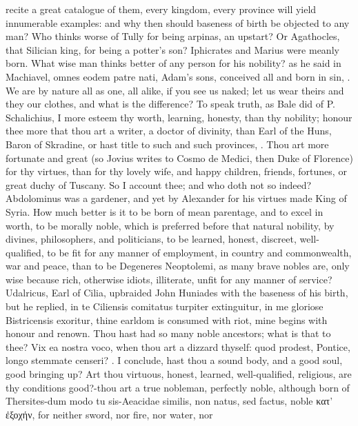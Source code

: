 {recite a great catalogue of them, every kingdom, every province will
yield innumerable examples: and why then should baseness of birth be
objected to any man? Who thinks worse of Tully for being arpinas, an
upstart? Or Agathocles, that Silician king, for being a potter's son?
Iphicrates and Marius were meanly born. What wise man thinks better of
any person for his nobility? as he said in Machiavel, omnes eodem
patre nati, Adam's sons, conceived all and born in sin, \etc{}. We are by
nature all as one, all alike, if you see us naked; let us wear theirs
and they our clothes, and what is the difference? To speak truth, as
Bale did of P. Schalichius, I more esteem thy worth, learning,
honesty, than thy nobility; honour thee more that thou art a writer, a
doctor of divinity, than Earl of the Huns, Baron of Skradine, or hast
title to such and such provinces, \etc{}. Thou art more fortunate and great
(so Jovius writes to Cosmo de Medici, then Duke of Florence) for
thy virtues, than for thy lovely wife, and happy children, friends,
fortunes, or great duchy of Tuscany. So I account thee; and who doth
not so indeed? Abdolominus was a gardener, and yet by Alexander
for his virtues made King of Syria. How much better is it to be born of
mean parentage, and to excel in worth, to be morally noble, which is
preferred before that natural nobility, by divines, philosophers, and
politicians, to be learned, honest, discreet, well-qualified, to
be fit for any manner of employment, in country and commonwealth, war
and peace, than to be Degeneres Neoptolemi, as many brave nobles are,
only wise because rich, otherwise idiots, illiterate, unfit for any
manner of service?  Udalricus, Earl of Cilia, upbraided John
Huniades with the baseness of his birth, but he replied, in te
Ciliensis comitatus turpiter extinguitur, in me gloriose Bistricensis
exoritur, thine earldom is consumed with riot, mine begins with honour
and renown. Thou hast had so many noble ancestors; what is that to
thee? Vix ea nostra voco, when thou art a dizzard thyself: quod
prodest, Pontice, longo stemmate censeri? \etc{}. I conclude, hast thou a
sound body, and a good soul, good bringing up? Art thou virtuous,
honest, learned, well-qualified, religious, are thy conditions
good?-thou art a true nobleman, perfectly noble, although born of
Thersites-dum modo tu sis-Aeacidae similis, non natus, sed factus,
noble κατ' ἐξοχήν, for neither sword, nor fire, nor water, nor
}
